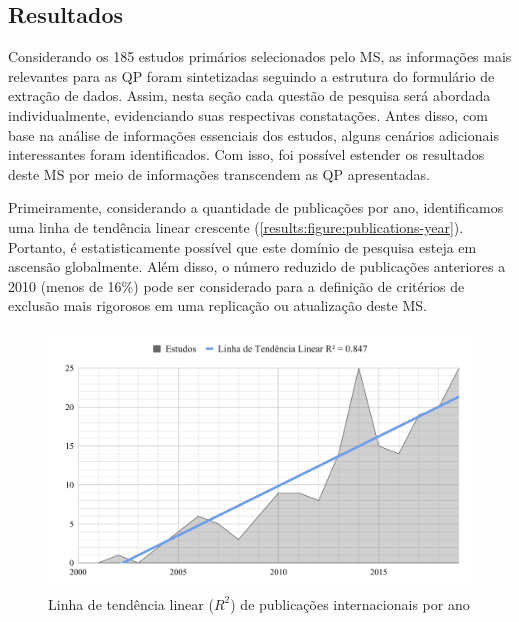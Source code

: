 \subsection{Resultados}
\label{ms:resultados}

Considerando os 185 estudos primários selecionados pelo MS, as informações mais relevantes para as QP foram sintetizadas seguindo a estrutura do formulário de extração de dados. Assim, nesta seção cada questão de pesquisa será abordada individualmente, evidenciando suas respectivas constatações. Antes disso, com base na análise de informações essenciais dos estudos, alguns cenários adicionais interessantes foram identificados. Com isso, foi possível estender os resultados deste MS por meio de informações transcendem as QP apresentadas.

Primeiramente, considerando a quantidade de publicações por ano, identificamos uma linha de tendência linear crescente (\autoref{results:figure:publications-year}). Portanto, é estatisticamente possível que este domínio de pesquisa esteja em ascensão globalmente. Além disso, o número reduzido de publicações anteriores a 2010 (menos de 16\%) pode ser considerado para a definição de critérios de exclusão mais rigorosos em uma replicação ou atualização deste MS.

\begin{figure}[htbp]
\caption{Linha de tendência linear ($R^2$) de publicações internacionais por ano}
\label{results:figure:publications-year}
\centerline{\includegraphics[width=\columnwidth]{images/publications-sm-timeline.pdf}}
\fautor
\end{figure}


